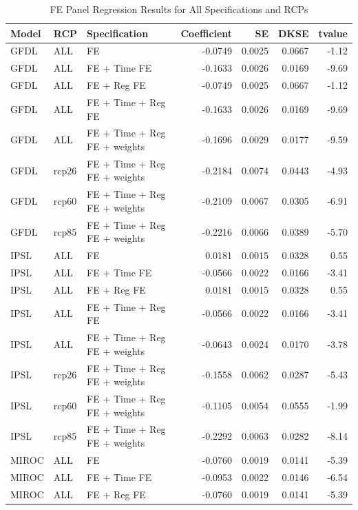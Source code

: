 \begin{table}[ht]
\centering
\caption{FE Panel Regression Results for All Specifications and RCPs} 
\label{tab:results_full}
\begin{tabular}{lllrrrr}
  \hline
Model & RCP & Specification & Coefficient & SE & DKSE & tvalue \\ 
  \hline
GFDL & ALL & FE & -0.0749 & 0.0025 & 0.0667 & -1.12 \\ 
  GFDL & ALL & FE + Time FE & -0.1633 & 0.0026 & 0.0169 & -9.69 \\ 
  GFDL & ALL & FE + Reg FE & -0.0749 & 0.0025 & 0.0667 & -1.12 \\ 
  GFDL & ALL & FE + Time + Reg FE & -0.1633 & 0.0026 & 0.0169 & -9.69 \\ 
  GFDL & ALL & FE + Time + Reg FE + weights & -0.1696 & 0.0029 & 0.0177 & -9.59 \\ 
  GFDL & rcp26 & FE + Time + Reg FE + weights & -0.2184 & 0.0074 & 0.0443 & -4.93 \\ 
  GFDL & rcp60 & FE + Time + Reg FE + weights & -0.2109 & 0.0067 & 0.0305 & -6.91 \\ 
  GFDL & rcp85 & FE + Time + Reg FE + weights & -0.2216 & 0.0066 & 0.0389 & -5.70 \\ 
  IPSL & ALL & FE & 0.0181 & 0.0015 & 0.0328 & 0.55 \\ 
  IPSL & ALL & FE + Time FE & -0.0566 & 0.0022 & 0.0166 & -3.41 \\ 
  IPSL & ALL & FE + Reg FE & 0.0181 & 0.0015 & 0.0328 & 0.55 \\ 
  IPSL & ALL & FE + Time + Reg FE & -0.0566 & 0.0022 & 0.0166 & -3.41 \\ 
  IPSL & ALL & FE + Time + Reg FE + weights & -0.0643 & 0.0024 & 0.0170 & -3.78 \\ 
  IPSL & rcp26 & FE + Time + Reg FE + weights & -0.1558 & 0.0062 & 0.0287 & -5.43 \\ 
  IPSL & rcp60 & FE + Time + Reg FE + weights & -0.1105 & 0.0054 & 0.0555 & -1.99 \\ 
  IPSL & rcp85 & FE + Time + Reg FE + weights & -0.2292 & 0.0063 & 0.0282 & -8.14 \\ 
  MIROC & ALL & FE & -0.0760 & 0.0019 & 0.0141 & -5.39 \\ 
  MIROC & ALL & FE + Time FE & -0.0953 & 0.0022 & 0.0146 & -6.54 \\ 
  MIROC & ALL & FE + Reg FE & -0.0760 & 0.0019 & 0.0141 & -5.39 \\ 

\end{tabular}
\end{table}
